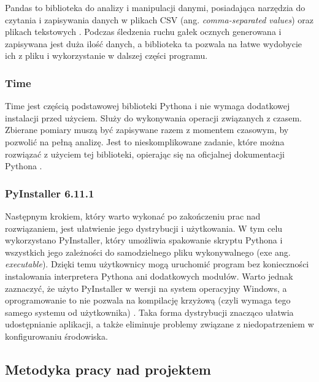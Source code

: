 \documentclass[a4paper,twoside,12pt]{book}
\newcommand{\obcy}[1]{\emph{#1}}
\newcommand{\english}[1]{{\selectlanguage{british}\obcy{#1}}}
\begin{document}
Pandas to biblioteka do analizy i manipulacji danymi, posiadająca narzędzia do czytania i zapisywania danych w plikach CSV (ang. \english{comma-separated values}) oraz plikach tekstowych \cite{bib:Pandas-about}. Podczas śledzenia ruchu gałek ocznych generowana i zapisywana jest duża ilość danych, a biblioteka ta pozwala na łatwe wydobycie ich z pliku i wykorzystanie w dalszej części programu.

\subsubsection{Time}

Time jest częścią podstawowej biblioteki Pythona i nie wymaga dodatkowej instalacji przed użyciem. Służy do wykonywania operacji związanych z czasem. Zbierane pomiary muszą być zapisywane razem z momentem czasowym, by pozwolić na pełną analizę. Jest to nieskomplikowane zadanie, które można rozwiązać z użyciem tej biblioteki, opierając się na oficjalnej dokumentacji Pythona \cite{bib:time-Python}.

\subsubsection{PyInstaller 6.11.1}

Następnym krokiem, który warto wykonać po zakończeniu prac nad rozwiązaniem, jest ułatwienie jego dystrybucji i użytkowania. W tym celu wykorzystano PyInstaller, który umożliwia spakowanie skryptu Pythona i wszystkich jego zależności do samodzielnego pliku wykonywalnego (exe ang. \english{executable}). Dzięki temu użytkownicy mogą uruchomić program bez konieczności instalowania interpretera Pythona ani dodatkowych modułów. Warto jednak zaznaczyć, że użyto PyInstaller w wersji na system operacyjny Windows, a oprogramowanie to nie pozwala na kompilację krzyżową (czyli wymaga tego samego systemu od użytkownika) \cite{bib:PyInstaller-manual}. Taka forma dystrybucji znacząco ułatwia udostępnianie aplikacji, a także eliminuje problemy związane z niedopatrzeniem w konfigurowaniu środowiska.

\subsection{Metodyka pracy nad projektem}
\label{subsec:Metodyka-pracy-nad-projektem}
\end{document}
